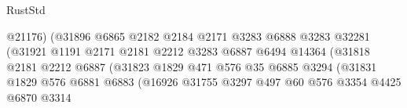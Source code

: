 \begin{lexlean}{RustStd}
\begin{coremodule}
                                                @21176)
                                              (@31896
                                                @6865
                                                @2182
                                                @2184
                                                @2171
                                                @3283
                                                @6888
                                                @3283
                                                @32281
                                                (@31921
                                                  @1191
                                                  @2171
                                                  @2181
                                                  @2212
                                                  @3283
                                                  @6887
                                                  @6494
                                                  @14364
                                                  (@31818
                                                    @2181
                                                    @2212
                                                    @6887
                                                    (@31823
                                                      @1829
                                                      @471
                                                      @576
                                                      @35
                                                      @6885
                                                      @3294
                                                      (@31831
                                                        @1829
                                                        @576
                                                        @6881
                                                        @6883
                                                        (@16926
                                                          @31755
                                                          @3297
                                                          @497
                                                          @60
                                                          @576
                                                          @3354
                                                          @4425
                                                          @6870
                                                          @3314

\end{coremodule}
\end{lexlean}
